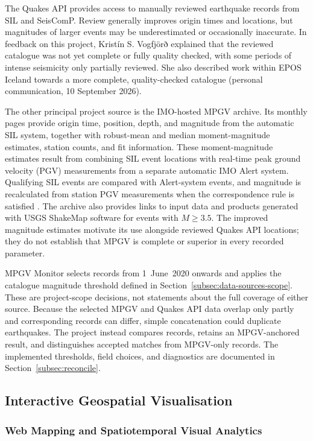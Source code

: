 \documentclass[12pt]{article}
\begin{document}
The Quakes API provides access to manually reviewed earthquake records from SIL and SeisComP. Review generally improves origin times and locations, but magnitudes of larger events may be underestimated or occasionally inaccurate. In feedback on this project, Kristín S. Vogfjörð explained that the reviewed catalogue was not yet complete or fully quality checked, with some periods of intense seismicity only partially reviewed. She also described work within EPOS Iceland towards a more complete, quality-checked catalogue (personal communication, 10 September 2026).

The other principal project source is the IMO-hosted MPGV archive. Its monthly pages provide origin time, position, depth, and magnitude from the automatic SIL system, together with robust-mean and median moment-magnitude estimates, station counts, and fit information. These moment-magnitude estimates result from combining SIL event locations with real-time peak ground velocity (PGV) measurements from a separate automatic IMO Alert system. Qualifying SIL events are compared with Alert-system events, and magnitude is recalculated from station PGV measurements when the correspondence rule is satisfied \cite{imo_mpgv_archive}. The archive also provides links to input data and products generated with USGS ShakeMap software for events with $M \geq 3.5$. The improved magnitude estimates motivate its use alongside reviewed Quakes API locations; they do not establish that MPGV is complete or superior in every recorded parameter.

MPGV Monitor selects records from 1~June~2020 onwards and applies the catalogue magnitude threshold defined in Section~\ref{subsec:data-sources-scope}. These are project-scope decisions, not statements about the full coverage of either source. Because the selected MPGV and Quakes API data overlap only partly and corresponding records can differ, simple concatenation could duplicate earthquakes. The project instead compares records, retains an MPGV-anchored result, and distinguishes accepted matches from MPGV-only records. The implemented thresholds, field choices, and diagnostics are documented in Section~\ref{subsec:reconcile}.

\subsection{Interactive Geospatial Visualisation}

\subsubsection{Web Mapping and Spatiotemporal Visual Analytics}
\end{document}
